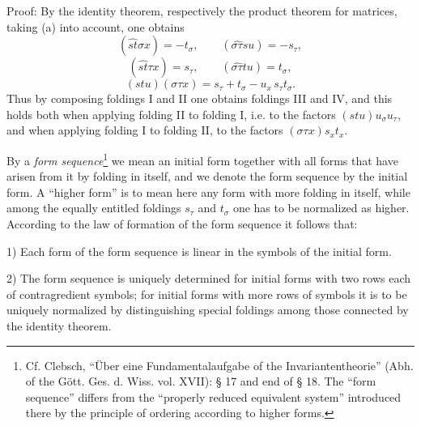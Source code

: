 \documentclass[11pt]{article}
\begin{document}
Proof: By the identity theorem, respectively the product theorem for matrices, taking (a) into account, one obtains
\[
(\widehat{st}\sigma x)=-t_\sigma,\qquad
(\widehat{\sigma\tau}su)=-s_\tau,
\]
\[
(\widehat{st}\tau x)=s_\tau,\qquad
(\widehat{\sigma\tau}tu)=t_\sigma,
\]
\[
(stu)(\sigma\tau x)=s_\tau+t_\sigma-u_x\,s_\tau t_\sigma .
\]
Thus by composing foldings I and II one obtains foldings III and IV, and this holds both when applying folding II to folding I, i.e. to the factors $(stu)u_\sigma u_\tau$, and when applying folding I to folding II, to the factors $(\sigma\tau x)s_xt_x$.

By a \emph{form sequence}\footnote{Cf. Clebsch, ``Über eine Fundamentalaufgabe of the Invariantentheorie'' (Abh. of the Gött. Ges. d. Wiss. vol. XVII): § 17 and end of § 18. The ``form sequence'' differs from the ``properly reduced equivalent system'' introduced there by the principle of ordering according to higher forms.} we mean an initial form together with all forms that have arisen from it by folding in itself, and we denote the form sequence by the initial form. A ``higher form'' is to mean here any form with more folding in itself, while among the equally entitled foldings $s_\tau$ and $t_\sigma$ one has to be normalized as higher. According to the law of formation of the form sequence it follows that:

1) Each form of the form sequence is linear in the symbols of the initial form.

2) The form sequence is uniquely determined for initial forms with two rows each of contragredient symbols; for initial forms with more rows of symbols it is to be uniquely normalized by distinguishing special foldings among those connected by the identity theorem.
\end{document}
